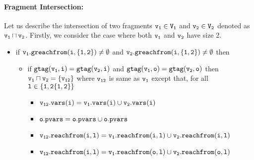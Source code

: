  \paragraph{Fragment Intersection:} Let us describe the intersection of two fragments $\tt \frag_1 \in \fragset_1$ and $\tt \frag_2 \in \fragset_2$ denoted as $\tt \frag_1 \sqcap \frag_2$. Firstly, we consider the case where both $\tt \frag_1$ and $\tt \frag_2$ have size 2.
 \begin{itemize}
 \item if $\tt \frag_1.greachfrom(i,\{1,2\}) \neq \emptyset$ and $\tt \frag_2.greachfrom(i,\{1,2\}) \neq \emptyset$ then 
  \begin{itemize}
  \item if $\tt gtag(\frag_1, i) = gtag(\frag_2, i)$ and $\tt gtag(\frag_1, o) = gtag(\frag_2, o)$ then $\tt \frag_1 \sqcap \frag_2 = \{\frag_{12}\}$ where $\tt \frag_{12}$ is same as $\tt \frag_1$ except that, for all $\tt l \in \{1,2 \{1,2\}\}$ 
  \begin{itemize}
  \item $\tt \frag_{12}.vars(i) = \frag_1.vars(i) \cup \frag_2.vars(i)$ 
  \item  $\tt \pvarsat{\outat{\frag_{12}}} = \pvarsat{\outat{\frag_1}} \cup \pvarsat{\outat{\frag_2}}$
  \item $\tt \frag_{12}.reachfrom(i,l) = \frag_{1}.reachfrom(i,l) \cup \frag_{2}.reachfrom(i,l)$
   \item $\tt \frag_{12}.reachfrom(i,l) = \frag_{1}.reachfrom(o,l) \cup \frag_{2}.reachfrom(o,l)$
    \end{itemize}
 \end{itemize}


\end{itemize}
